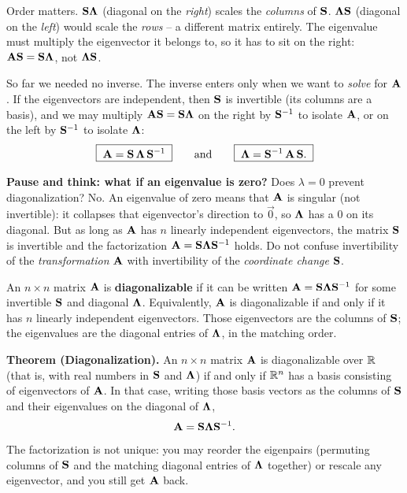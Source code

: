 \begin{trapbox}
Order matters. $\mathbf{S}\mathbf{\Lambda}$ (diagonal on the \emph{right}) scales the
\emph{columns} of $\mathbf{S}$. $\mathbf{\Lambda}\mathbf{S}$ (diagonal on the
\emph{left}) would scale the \emph{rows} -- a different matrix entirely. The
eigenvalue must multiply the eigenvector it belongs to, so it has to sit on the
right: $\mathbf{A}\mathbf{S} = \mathbf{S}\mathbf{\Lambda}$, not $\mathbf{\Lambda}\mathbf{S}$.
\end{trapbox}

So far we needed no inverse. The inverse enters only when we want to
\emph{solve} for $\mathbf{A}$. If the eigenvectors are independent, then $\mathbf{S}$ is
invertible (its columns are a basis), and we may multiply $\mathbf{A}\mathbf{S} =
\mathbf{S}\mathbf{\Lambda}$ on the right by $\mathbf{S}^{-1}$ to isolate $\mathbf{A}$, or on the
left by $\mathbf{S}^{-1}$ to isolate $\mathbf{\Lambda}$:
\[
  \boxed{\;\mathbf{A} = \mathbf{S}\,\mathbf{\Lambda}\,\mathbf{S}^{-1}\;}
  \qquad\text{and}\qquad
  \boxed{\;\mathbf{\Lambda} = \mathbf{S}^{-1}\,\mathbf{A}\,\mathbf{S}.\;}
\]

\begin{intuitionbox}
\textbf{Pause and think: what if an eigenvalue is zero?} Does $\lambda = 0$
prevent diagonalization? No. An eigenvalue of zero means that
$\mathbf{A}$ is singular (not invertible): it collapses that eigenvector's
direction to $\vec{0}$, so $\mathbf{\Lambda}$ has a $0$ on its diagonal. But as long
as $\mathbf{A}$ has $n$ linearly independent eigenvectors, the matrix
$\mathbf{S}$ is invertible and the factorization
$\mathbf{A} = \mathbf{S}\mathbf{\Lambda}\mathbf{S}^{-1}$ holds. Do not
confuse invertibility of the \emph{transformation} $\mathbf{A}$ with invertibility
of the \emph{coordinate change} $\mathbf{S}$.
\end{intuitionbox}

\begin{definition}
\label{ch24:def-diagonalizable}
An $n\times n$ matrix $\mathbf{A}$ is \textbf{diagonalizable} if it can be written
$\mathbf{A} = \mathbf{S}\mathbf{\Lambda}\mathbf{S}^{-1}$ for some invertible $\mathbf{S}$ and
diagonal $\mathbf{\Lambda}$. Equivalently, $\mathbf{A}$ is diagonalizable if and only
if it has $n$ linearly independent eigenvectors. Those eigenvectors are the
columns of $\mathbf{S}$; the eigenvalues are the diagonal entries of
$\mathbf{\Lambda}$, in the matching order.
\end{definition}

\begin{formalbox}
\textbf{Theorem (Diagonalization).} An $n\times n$ matrix $\mathbf{A}$ is
diagonalizable over $\mathbb{R}$ (that is, with real numbers in $\mathbf{S}$ and
$\mathbf{\Lambda}$) if and only if $\mathbb{R}^n$ has a basis consisting of
eigenvectors of $\mathbf{A}$. In that case, writing those basis vectors as the
columns of $\mathbf{S}$ and their eigenvalues on the diagonal of $\mathbf{\Lambda}$,
\[
  \mathbf{A} = \mathbf{S}\mathbf{\Lambda}\mathbf{S}^{-1} .
\]
The factorization is not unique: you may reorder the eigenpairs (permuting
columns of $\mathbf{S}$ and the matching diagonal entries of $\mathbf{\Lambda}$
together) or rescale any eigenvector, and you still get $\mathbf{A}$ back.
\end{formalbox}

